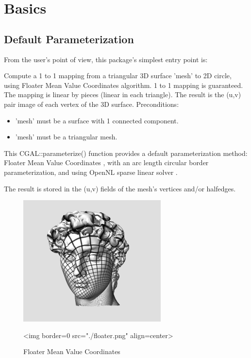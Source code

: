\section{Basics}


\subsection{Default Parameterization}

From the user's point of view, this package's simplest entry point is:

{
Compute a 1 to 1 mapping from a triangular 3D surface 'mesh' to 2D circle, using
Floater Mean Value Coordinates algorithm. 1 to 1 mapping is guaranteed.
The mapping is linear by pieces (linear in each triangle). The result is the (u,v) pair image of each vertex of the 3D surface.
Preconditions:\begin{itemize}
\item 'mesh' must be a surface with 1 connected component.\item 'mesh' must be a triangular mesh.\end{itemize}
}

This CGAL::parameterize() function provides a default parameterization method:
Floater Mean Value Coordinates \cite{cgal:f-mvc-03}, with an arc length circular border
parameterization, and using OpenNL sparse linear solver \cite{cgal:l-nmdgp-05}.

The result is stored in the (u,v) fields of the mesh's vertices and/or halfedges.

\begin{figure}[bht]
    \begin{center}
        \begin{ccTexOnly}
            \includegraphics{Parameterization/floater} %
        \end{ccTexOnly}
        \begin{ccHtmlOnly}
            <img border=0 src="./floater.png" align=center>
        \end{ccHtmlOnly}
        \label{parameterization-fig-floater}

        \caption{Floater Mean Value Coordinates}
    \end{center}
\end{figure}


